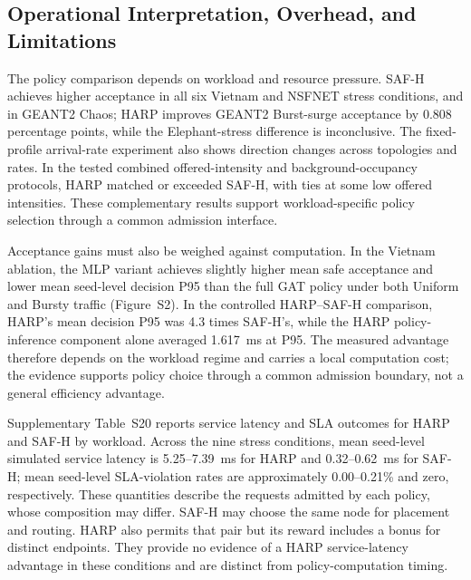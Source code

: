 \documentclass[final,5p]{elsarticle}
\newcommand{\rev}[1]{\textcolor{revisiongreen}{#1}}
\let\newrev\rev
\begin{document}
\subsection{\newrev{Operational Interpretation, Overhead, and Limitations}}
\label{subsec:operational_interpretation}
\newrev{The policy comparison depends on workload and resource pressure. SAF-H achieves higher acceptance in all six Vietnam and NSFNET stress conditions, and in GEANT2 Chaos; HARP improves GEANT2 Burst-surge acceptance by 0.808 percentage points, while the Elephant-stress difference is inconclusive. The fixed-profile arrival-rate experiment also shows direction changes across topologies and rates. In the tested combined offered-intensity and background-occupancy protocols, HARP matched or exceeded SAF-H, with ties at some low offered intensities. These complementary results support workload-specific policy selection through a common admission interface.}

\newrev{Acceptance gains must also be weighed against computation. In the Vietnam ablation, the MLP variant achieves slightly higher mean safe acceptance and lower mean seed-level decision P95 than the full GAT policy under both Uniform and Bursty traffic (Figure~S2). In the controlled HARP--SAF-H comparison, HARP's mean decision P95 was 4.3 times SAF-H's, while the HARP policy-inference component alone averaged 1.617~ms at P95. The measured advantage therefore depends on the workload regime and carries a local computation cost; the evidence supports policy choice through a common admission boundary, not a general efficiency advantage.}

\newrev{Supplementary Table~S20 reports service latency and SLA outcomes for HARP and SAF-H by workload. Across the nine stress conditions, mean seed-level simulated service latency is 5.25--7.39~ms for HARP and 0.32--0.62~ms for SAF-H; mean seed-level SLA-violation rates are approximately 0.00--0.21\% and zero, respectively. These quantities describe the requests admitted by each policy, whose composition may differ. SAF-H may choose the same node for placement and routing. HARP also permits that pair but its reward includes a bonus for distinct endpoints. They provide no evidence of a HARP service-latency advantage in these conditions and are distinct from policy-computation timing.}
\end{document}

